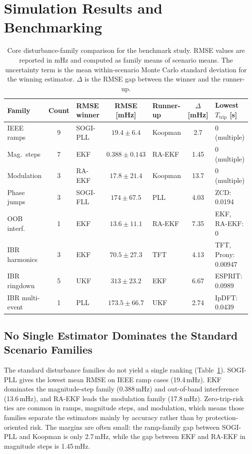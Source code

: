 \section{Simulation Results and Benchmarking}
\label{sec:results}

\begin{table}[t]
  \centering
  \caption{Core disturbance-family comparison for the benchmark study.
    RMSE values are reported in mHz and computed as family means of
    scenario means. The uncertainty term is the mean within-scenario Monte
    Carlo standard deviation for the winning estimator. $\Delta$ is the RMSE gap
    between the winner and the runner-up.}
  \label{tab:family_summary}
  \scriptsize
  \setlength{\tabcolsep}{2.8pt}
  \renewcommand{\arraystretch}{1.1}
  \begin{tabular}{l c l c l c l}
    \toprule
    Family & Count & RMSE winner & RMSE [mHz] & Runner-up & $\Delta$ [mHz] & Lowest $T_{\mathrm{trip}}$ [s] \\
    \midrule
    IEEE ramps & 9 & SOGI-PLL & $19.4 \pm 6.4$ & Koopman & 2.7 & 0 (multiple) \\
    Mag.\ steps & 7 & EKF & $0.388 \pm 0.143$ & RA-EKF & 1.45 & 0 (multiple) \\
    Modulation & 3 & RA-EKF & $17.8 \pm 21.4$ & Koopman & 13.7 & 0 (multiple) \\
    Phase jumps & 3 & SOGI-FLL & $174 \pm 67.5$ & PLL & 4.03 & ZCD: 0.0194 \\
    OOB interf. & 1 & EKF & $13.6 \pm 11.1$ & RA-EKF & 7.35 & EKF, RA-EKF: 0 \\
    IBR harmonics & 3 & EKF & $70.5 \pm 27.3$ & TFT & 4.13 & TFT, Prony: 0.00947 \\
    IBR ringdown & 5 & UKF & $313 \pm 23.2$ & EKF & 6.67 & ESPRIT: 0.0989 \\
    IBR multi-event & 1 & PLL & $173.5 \pm 66.7$ & UKF & 2.74 & IpDFT: 0.0439 \\
    \bottomrule
  \end{tabular}
\end{table}

\subsection{No Single Estimator Dominates the Standard Scenario Families}

The standard disturbance families do not yield a single ranking
(Table~\ref{tab:family_summary}). SOGI-PLL gives the lowest mean RMSE on IEEE
ramp cases (19.4\,mHz). EKF dominates the magnitude-step family
(0.388\,mHz) and out-of-band interference (13.6\,mHz), and RA-EKF leads the
modulation family (17.8\,mHz). Zero-trip-risk ties are common in ramps,
magnitude steps, and
modulation, which means those families separate the estimators mainly by
accuracy rather than by protection-oriented risk. The margins are often small:
the ramp-family gap between SOGI-PLL and Koopman is only 2.7\,mHz, while the
gap between EKF and RA-EKF in magnitude steps is 1.45\,mHz.

